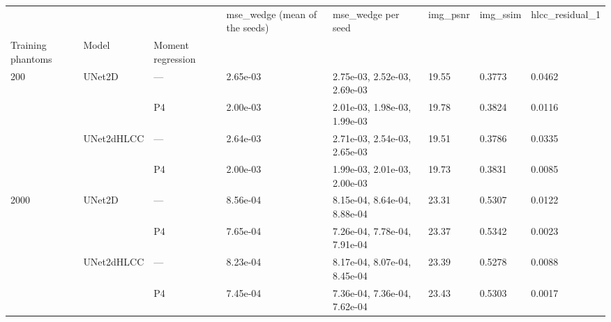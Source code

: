 \begin{tabular}{llllllll}
\toprule
 &  &  & mse\_wedge (mean of the seeds) & mse\_wedge per seed & img\_psnr & img\_ssim & hlcc\_residual\_1 \\
Training phantoms & Model & Moment regression &  &  &  &  &  \\
\midrule
\multirow[t]{4}{*}{200} & \multirow[t]{2}{*}{UNet2D} & — & 2.65e-03 & 2.75e-03, 2.52e-03, 2.69e-03 & 19.55 & 0.3773 & 0.0462 \\
 &  & P4 & 2.00e-03 & 2.01e-03, 1.98e-03, 1.99e-03 & 19.78 & 0.3824 & 0.0116 \\
\cline{2-8}
 & \multirow[t]{2}{*}{UNet2dHLCC} & — & 2.64e-03 & 2.71e-03, 2.54e-03, 2.65e-03 & 19.51 & 0.3786 & 0.0335 \\
 &  & P4 & 2.00e-03 & 1.99e-03, 2.01e-03, 2.00e-03 & 19.73 & 0.3831 & 0.0085 \\
\cline{1-8} \cline{2-8}
\multirow[t]{4}{*}{2000} & \multirow[t]{2}{*}{UNet2D} & — & 8.56e-04 & 8.15e-04, 8.64e-04, 8.88e-04 & 23.31 & 0.5307 & 0.0122 \\
 &  & P4 & 7.65e-04 & 7.26e-04, 7.78e-04, 7.91e-04 & 23.37 & 0.5342 & 0.0023 \\
\cline{2-8}
 & \multirow[t]{2}{*}{UNet2dHLCC} & — & 8.23e-04 & 8.17e-04, 8.07e-04, 8.45e-04 & 23.39 & 0.5278 & 0.0088 \\
 &  & P4 & 7.45e-04 & 7.36e-04, 7.36e-04, 7.62e-04 & 23.43 & 0.5303 & 0.0017 \\
\cline{1-8} \cline{2-8}
\bottomrule
\end{tabular}
